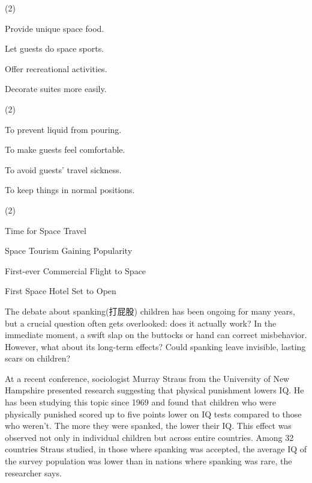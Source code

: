 \documentclass{英语试卷}
\begin{document}
\begin{choices}(2)
  \item Provide unique space food.
  \item Let guests do space sports.
  \item Offer recreational activities.
  \item Decorate suites more easily.
\end{choices}
\begin{choices}(2)
  \item To prevent liquid from pouring.
  \item To make guests feel comfortable.
  \item To avoid guests' travel sickness.
  \item To keep things in normal positions.
\end{choices}
\begin{choices}(2)
  \item Time for Space Travel
  \item Space Tourism Gaining Popularity
  \item First-ever Commercial Flight to Space
  \item First Space Hotel Set to Open
\end{choices}
\par The debate about spanking(打屁股) children has been ongoing for many years, but a crucial question often gets overlooked: does it actually work? In the immediate moment, a swift slap on the buttocks or hand can correct misbehavior. However, what about its long-term effects? Could spanking leave invisible, lasting scars on children?\par
\par At a recent conference, sociologist Murray Straus from the University of New Hampshire presented research suggesting that physical punishment lowers IQ. He has been studying this topic since 1969 and found that children who were physically punished scored up to five points lower on IQ tests compared to those who weren't. The more they were spanked, the lower their IQ. This effect was observed not only in individual children but across entire countries. Among 32 countries Straus studied, in those where spanking was accepted, the average IQ of the survey population was lower than in nations where spanking was rare, the researcher says.\par
\end{document}
